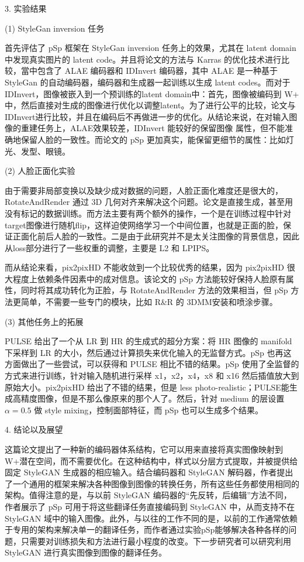 3. 实验结果

(1) StyleGan inversion 任务

首先评估了 pSp 框架在 StyleGan inversion 任务上的效果，尤其在 latent domain 中发现真实图片的 latent code。并且将论文的方法与 Karras 的优化技术进行比较，當中包含了 ALAE 编码器和 IDInvert 编码器，其中 ALAE 是一种基于 StyleGan 的自动编码器，编码器和生成器一起训练以生成 latent codes。而对于 IDInvert，图像被嵌入到一个预训练的latent domain中：首先，图像被编码到 W+ 中，然后直接对生成的图像进行优化以调整latent。为了进行公平的比较，论文与IDInvert进行比较，并且在编码后不再做进一步的优化。从结论来说，在对输入图像的重建任务上，ALAE效果较差，IDInvert 能较好的保留图像
属性，但不能准确地保留人脸的一致性。而论文的 pSp 更加真实，能保留更细节的属性：比如灯光、发型、眼镜。

(2) 人脸正面化实验

由于需要非局部变换以及缺少成对数据的问题，人脸正面化难度还是很大的，RotateAndRender 通过 3D 几何对齐来解决这个问题。论文是直接生成，甚至用没有标记的数据训练。而方法主要有两个额外的操作，一个是在训练过程中针对target图像进行随机flip，这样迫使网络学习一个中间位置，也就是正面的脸，保证正面化前后人脸的一致性。二是由于此研究并不是太关注图像的背景信息，因此从loss部分进行了一些权重的调整，主要是 L2 和 LPIPS。

而从结论来看，pix2pixHD 不能收敛到一个比较优秀的结果，因为 pix2pixHD 很大程度上依赖条件因素中的成对信息。该论文的 pSp 方法能较好保持人脸原有属性，同时将其成功转化为正脸，与  RotateAndRender 方法的效果相当，但 pSp 方法更简单，不需要一些专门的模块，比如 R\&R 的 3DMM安装和喷涂步骤。

(3) 其他任务上的拓展

PULSE 给出了一个从 LR 到 HR 的生成式的超分方案：将 HR 图像的 manifold 下采样到 LR 的大小，然后通过计算损失来优化输入的无监督方式。pSp 也再这方面做出了一些尝试，可以获得和 PULSE 相比不错的结果。pSp 使用了全监督的方式来进行训练，针对输入随机进行采样 x1，x2，x4，x8 和 x16 然后插值放大到原始大小。pix2pixHD 给出了不错的结果，但是 less photo-realistic；PULSE能生成高精度图像，但是不那么像原来的那个人了。然后，针对 medium 的层设置 $\alpha = 0.5$ 做 style mixing，控制面部特征，而 pSp 也可以生成多个结果。

4. 结论以及展望

这篇论文提出了一种新的编码器体系结构，它可以用来直接将真实图像映射到W+潜在空间，而不需要优化。在这种结构中，样式以分层方式提取，并被提供给固定 StyleGAN 生成器的相应输入。结合编码器和 StyleGAN 解码器，作者提出了一个通用的框架来解决各种图像到图像的转换任务，所有这些任务都使用相同的架构。值得注意的是，与以前 StyleGAN 编码器的“先反转，后编辑”方法不同，作者展示了 pSp 可用于将这些翻译任务直接编码到 StyleGAN 中，从而支持不在 StyleGAN 域中的输入图像。此外，与以往的工作不同的是，以前的工作通常依赖于专用的架构来解决单一的翻译任务，而作者通过实验pSp能够解决各种各样的问题，只需要对训练损失和方法进行最小程度的改变。下一步研究者可以研究利用 StyleGAN 进行真实图像到图像的翻译任务。

